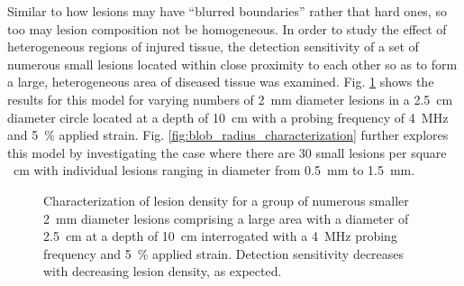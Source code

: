 			Similar to how lesions may have ``blurred boundaries'' rather that hard ones, so too may lesion composition not be homogeneous. In order to study the effect of heterogeneous regions of injured tissue, the detection sensitivity of a set of numerous small lesions located within close proximity to each other so as to form a large, heterogeneous area of diseased tissue was examined. Fig. \ref{fig:blob_density_characterization} shows the results for this model for varying numbers of \SI{2}{\mm} diameter lesions in a \SI{2.5}{\cm} diameter circle located at a depth of \SI{10}{\cm} with a probing frequency of \SI{4}{\MHz} and \SI{5}{\percent} applied strain. Fig. \ref{fig:blob_radius_characterization} further explores this model by investigating the case where there are 30 small lesions per square \SI{}{\cm} with individual lesions ranging in diameter from \SI{0.5}{\mm} to \SI{1.5}{\mm}.

			\begin{figure}[!htb]
				\centering
				\caption[Quasi-static lesion density characterization]{Characterization of lesion density for a group of numerous smaller \SI{2}{\mm} diameter lesions comprising a large area with a diameter of \SI{2.5}{\cm} at a depth of \SI{10}{\cm} interrogated with a \SI{4}{\MHz} probing frequency and \SI{5}{\percent} applied strain. Detection sensitivity decreases with decreasing lesion density, as expected.}
				\label{fig:blob_density_characterization}
			\end{figure}

